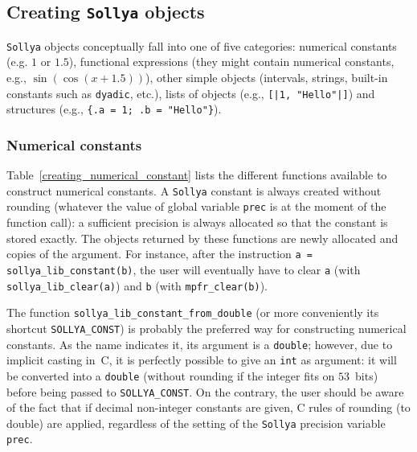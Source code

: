 \documentclass[a4paper]{article}
\newcommand{\sollya}{\texttt{Sollya}\xspace}
\begin{document}
\subsection{Creating \sollya objects}
\sollya objects conceptually fall into one of five categories: numerical constants (e.g. $1$ or $1.5$), functional expressions (they might contain numerical constants, e.g., $\sin(\cos(x+1.5))$), other simple objects (intervals, strings, built-in constants such as \texttt{dyadic}, etc.), lists of objects (e.g., \texttt{[|1, "Hello"|]}) and structures (e.g., \verb|{.a = 1; .b = "Hello"}|).

\subsubsection{Numerical constants}
Table~\ref{creating_numerical_constant} lists the different functions available to construct numerical constants. A \sollya constant is always created without rounding (whatever the value of global variable \texttt{prec} is at the moment of the function call): a sufficient precision is always allocated so that the constant is stored exactly. The objects returned by these functions are newly allocated and copies of the argument. For instance, after the instruction \texttt{a = sollya\_lib\_constant(b)}, the user will eventually have to clear \texttt{a} (with \texttt{sollya\_lib\_clear(a)}) and \texttt{b} (with \texttt{mpfr\_clear(b)}).

The function \texttt{sollya\_lib\_constant\_from\_double} (or more conveniently its shortcut \texttt{SOLLYA\_CONST}) is probably the preferred way for constructing numerical constants. As the name indicates it, its argument is a \texttt{double}; however, due to implicit casting in~C, it is perfectly possible to give an \texttt{int} as argument: it will be converted into a \texttt{double} (without rounding if the integer fits on $53$~bits) before being passed to \texttt{SOLLYA\_CONST}. On the contrary, the user should be aware of the fact that if decimal non-integer constants are given, C rules of rounding (to double) are applied, regardless of the setting of the \sollya precision variable \texttt{prec}.
\end{document}

